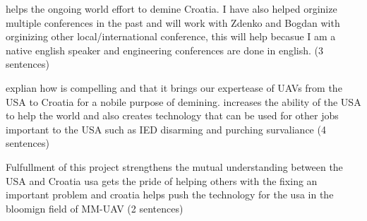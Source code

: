 \documentclass[12pt]{article}
\begin{document}
helps the ongoing world effort to demine Croatia.  I have also helped orginize multiple conferences in 
the past and will work with Zdenko and Bogdan with orginizing other local/international conference, 
this will help becasue I am a native english speaker and engineering conferences are done in english. 
(3 sentences)



explian how is compelling and that it brings our expertease of UAVs from the USA to Croatia for a 
nobile purpose of demining.  increases the ability of the USA to help the world and also creates 
technology that can be used for other jobs important to the USA such as IED disarming and purching 
survaliance (4 sentences)





Fulfullment of this project strengthens the mutual understanding between the USA and Croatia 
usa gets the pride of helping others with the fixing an important problem and croatia helps push the 
technology for the usa in the bloomign field of MM-UAV (2 sentences)
\end{document}
